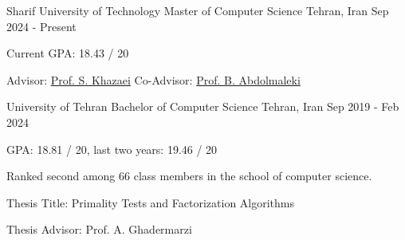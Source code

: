 \vspace{-18pt}

\begin{cventries}
  \cventry
  {Sharif University of Technology}
  {Master of Computer Science}
  {Tehran, Iran}
  {Sep 2024 - Present}
  {
    \begin{cvitems}
      \item {Current GPA: 18.43 / 20}
      \item {Advisor: \href{https://scholar.google.com/citations?user=Lmav-VUAAAAJ&hl=en}{Prof. S. Khazaei}}
      \hspace{1cm}
      {Co-Advisor: \href{https://scholar.google.com/citations?user=he03TMsAAAAJ&hl=en}{Prof. B. Abdolmaleki}}
    \end{cvitems}
  }

  \cventry
  {University of Tehran}
  {Bachelor of Computer Science}
  {Tehran, Iran}
  {Sep 2019 - Feb 2024}
  {
    \begin{cvitems}
      \item {GPA: 18.81 / 20, last two years: 19.46 / 20}
      \item Ranked second among 66 class members in the school of computer science.
      \item Thesis Title: Primality Tests and Factorization Algorithms
      \item Thesis Advisor: Prof. A. Ghadermarzi
    \end{cvitems}
  }
\end{cventries}
